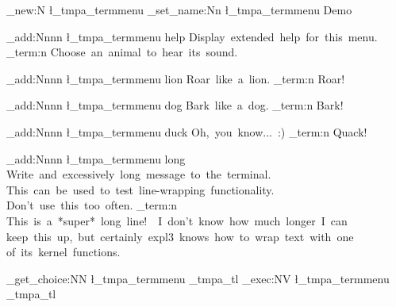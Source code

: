  \relax \ExplSyntaxOn
 \relax

\termmenu_new:N \l_tmpa_termmenu
\termmenu_set_name:Nn \l_tmpa_termmenu { Demo }
 
\termmenu_add:Nnnn \l_tmpa_termmenu { help }
 { Display~extended~help~for~this~menu. }
 { \msg_term:n { Choose~an~animal~to~hear~its~sound. } }
 
\termmenu_add:Nnnn \l_tmpa_termmenu { lion }
 { Roar~like~a~lion. }
 { \msg_term:n { Roar! } }
 
\termmenu_add:Nnnn \l_tmpa_termmenu { dog }
 { Bark~like~a~dog. }
 { \msg_term:n { Bark! } }
 
\termmenu_add:Nnnn \l_tmpa_termmenu { duck }
 { Oh,~you~know...~:) }
 { \msg_term:n { Quack! } }

\termmenu_add:Nnnn \l_tmpa_termmenu { long }
 {
  Write~and~excessively~long~message~to~the~terminal.~
  This~can~be~used~to~test~line-wrapping~functionality.~
  Don't~use~this~too~often.
 }
 {
  \msg_term:n
   {
    This~is~a~*super*~long~line!~~I~don't~know~how~much~longer~I~can~
    keep~this~up,~but~certainly~expl3~knows~how~to~wrap~text~with~one~
    of~its~kernel~functions.
   }
 }
 
\termmenu_get_choice:NN \l_tmpa_termmenu \g_tmpa_tl
\termmenu_exec:NV \l_tmpa_termmenu \g_tmpa_tl

\bye
